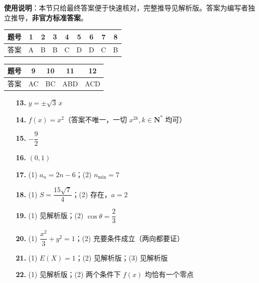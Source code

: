 
\begin{gknotice}
\textbf{使用说明}：本节只给最终答案便于快速核对，完整推导见解析版。答案为编写者独立推导，\textbf{非官方标准答案}。
\end{gknotice}

\begin{center}\begin{tabular}{ccccccccc}
\toprule
题号 & 1 & 2 & 3 & 4 & 5 & 6 & 7 & 8 \\
\midrule
答案 & A & B & B & C & D & D & C & B \\
\bottomrule
\end{tabular}\end{center}

\begin{center}\begin{tabular}{ccccc}
\toprule
题号 & 9 & 10 & 11 & 12 \\
\midrule
答案 & AC & BC & ABD & ACD \\
\bottomrule
\end{tabular}\end{center}

\begin{itemize}[leftmargin=2.6em]
  \item[\textbf{13.}] $y=\pm\sqrt3\,x$
  \item[\textbf{14.}] $f(x)=x^{2}$（答案不唯一，一切 $x^{2k},k\in\mathbf N^{*}$ 均可）
  \item[\textbf{15.}] $-\dfrac92$
  \item[\textbf{16.}] $(0,1)$
\end{itemize}

\begin{itemize}[leftmargin=2.6em]
  \item[\textbf{17.}] (1) $a_n=2n-6$；(2) $n_{\min}=7$
  \item[\textbf{18.}] (1) $S=\dfrac{15\sqrt7}4$；(2) 存在，$a=2$
  \item[\textbf{19.}] (1) 见解析版；(2) $\cos\theta=\dfrac23$
  \item[\textbf{20.}] (1) $\dfrac{x^{2}}3+y^{2}=1$；(2) 充要条件成立（两向都要证）
  \item[\textbf{21.}] (1) $E(X)=1$；(2) 见解析版；(3) 见解析版
  \item[\textbf{22.}] (1) 见解析版；(2) 两个条件下 $f(x)$ 均恰有一个零点
\end{itemize}
